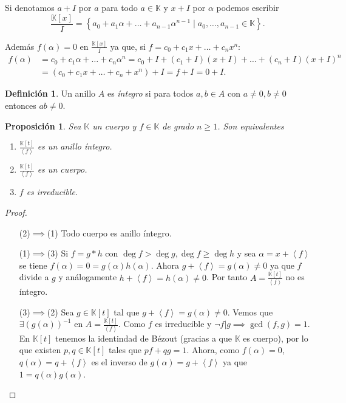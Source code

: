 \documentclass[10pt, spanish]{report}
\newtheorem{prop}[tma]{Proposición}
\theoremstyle{definition}
\newtheorem*{defin}{Definición}
\newcommand{\K}{\mathbb{K}}
\renewcommand{\geq}{\geqslant}
\newcommand{\fecha}[1]{\marginpar{\underline{\footnotesize{#1}}}}
\begin{document}
Si denotamos $a+I$ por $a$ para todo $a\in\K$ y $x+I$ por $\alpha$ podemos
escribir \[\frac{\K[x]}{I}=\left\{ a_0+a_1\alpha+\ldots+a_{n-1}\alpha^{n-1}\mid
a_0,\ldots,a_{n-1} \in\K \right\}.\]

Además $f(\alpha)=0$ en $\frac{\K[x]}{I}$ ya que, si $f=c_0+c_1x+\ldots+c_nx^n$:
\begin{align*}
    f(\alpha)&=c_0+c_1\alpha+\ldots+c_n\alpha^n=c_0+I+(c_1+I)(x+I)+\ldots
    +(c_n+I)(x+I)^n\\
             &=(c_0+c_1x+\ldots+c_n+x^n)+I=f+I=0+I.
\end{align*}

\fecha{17/02}
\begin{defin}
    Un anillo $A$ es \textit{íntegro} si para todos $a,b\in A$ con $a\neq 0, b
    \neq 0$ entonces $ab\neq 0$.
\end{defin}

\newpage
\begin{prop}\label{prop:carirred}
    Sea $\K$ un cuerpo y $f\in \K$ de grado $n\geq1$. Son equivalentes
    \begin{enumerate}
        \item $\frac{\K[t]}{\left< f \right>}$ es un anillo íntegro.
        \item $\frac{\K[t]}{\left< f\right>}$ es un cuerpo.
        \item $f$ es irreducible.
    \end{enumerate}
\end{prop}

\begin{proof}\hspace{1em}
    \begin{itemize}[itemindent=36pt]
        \item[(2)$\implies$(1)] Todo cuerpo es anillo íntegro.
        \item[(1)$\implies$(3)] Si $f=g*h$ con $\deg{f}>\deg{g},\deg{f}\geq
            \deg{h}$ y sea $\alpha = x+\left< f \right> $ se tiene $f(\alpha)=0
            =g(\alpha)h(\alpha)$. Ahora $g+\left< f \right> = g(\alpha) \neq 0$
            ya que $f$ divide a $g$ y análogamente $h+\left< f \right> =
            h(\alpha)\neq 0$.
            Por tanto $A=\frac{\K[t]}{\left< f \right> }$ no es íntegro.
        \item[(3)$\implies$(2)] Sea $g\in \K[t]$  tal que $g+\left< f \right>
            =g(\alpha)\neq 0$. Vemos que $\exists(g(\alpha))^{-1}$ en
            $A=\frac{\K[t]}{\left< f \right> }$. Como $f$ es irreducible y
            $\neg f|g \implies \gcd(f,g)=1$. En $\K[t]$ tenemos la identindad de
            Bézout (gracias a que $\K$ es cuerpo), por lo que existen $p,q\in
            \K[t]$ tales que $pf+qg=1$.
            Ahora, como $f(\alpha)=0$, $q(\alpha)=q+\left< f \right>$  es el
            inverso de $g(\alpha)=g+\left< f \right>$ ya que $1=q(\alpha)
            g(\alpha)$.
    \end{itemize}
    \vspace{-1.75em}
\end{proof}
\end{document}
